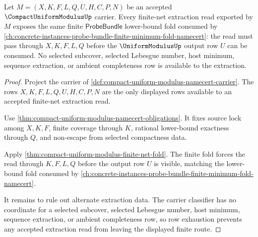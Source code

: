 \begin{theorem}
\label{thm:compact-uniform-modulus-finite-net-extraction}
Let $M=(X,K,F,L,Q,U,H,C,P,N)$ be an accepted $\CompactUniformModulusUp$ carrier. Every finite-net extraction read exported by $M$ exposes the same finite $\mathsf{ProbeBundle}$ lower-bound fold consumed by \autoref{ch:concrete-instances-probe-bundle-finite-minimum-fold-namecert}: the read must pass through $X,K,F,L,Q$ before the $\UniformModulusUp$ output row $U$ can be consumed. No selected subcover, selected Lebesgue number, host minimum, sequence extraction, or ambient completeness row is available to the extraction.
\end{theorem}
\begin{proof}
Project the carrier of \autoref{def:compact-uniform-modulus-namecert-carrier}. The rows $X,K,F,L,Q,U,H,C,P,N$ are the only displayed rows available to an accepted finite-net extraction read.

Use \autoref{thm:compact-uniform-modulus-namecert-obligations}. It fixes source lock among $X,K,F$, finite coverage through $K$, rational lower-bound exactness through $Q$, and non-escape from selected compactness data.

Apply \autoref{thm:compact-uniform-modulus-finite-net-fold}. The finite fold forces the read through $K,F,L,Q$ before the output row $U$ is visible, matching the lower-bound fold consumed by \autoref{ch:concrete-instances-probe-bundle-finite-minimum-fold-namecert}.

It remains to rule out alternate extraction data. The carrier classifier has no coordinate for a selected subcover, selected Lebesgue number, host minimum, sequence extraction, or ambient completeness row, so row exhaustion prevents any accepted extraction read from leaving the displayed finite route.
\end{proof}

